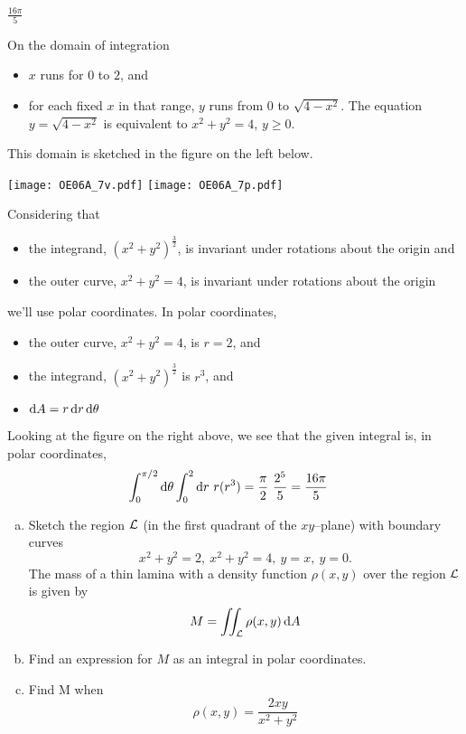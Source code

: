 \begin{answer}
$\frac{16\pi}{5}$
\end{answer}

\begin{solution}
On the domain of integration
\begin{itemize}
\item
$x$ runs for $0$ to $2$, and

\item
for each fixed $x$ in that range, $y$ runs from $0$ to $\sqrt{4-x^2}$.
The equation $y=\sqrt{4-x^2}$ is equivalent to $x^2+y^2=4$, $y\ge 0$.
\end{itemize}
This domain is sketched in the figure on the left below.
\begin{center}
     \texttt{[image: OE06A\_7v.pdf]}\qquad
     \texttt{[image: OE06A\_7p.pdf]}
\end{center}
Considering that
\begin{itemize}
\item
the integrand, ${(x^2+y^2)}^{\frac{3}{2}}$, is invariant under rotations 
about the origin and
\item
the outer curve, $x^2+y^2=4$, is invariant under rotations about the origin \end{itemize}
we'll use polar coordinates. 
In polar coordinates, 
\begin{itemize}
\item
the outer curve, $x^2+y^2=4$, is $r=2$, and
\item 
the integrand, ${(x^2+y^2)}^{\frac{3}{2}}$ is $r^3$, and
\item
$\mathrm{d}A=r\,\mathrm{d}r\,\mathrm{d}\theta$
\end{itemize}
Looking at the figure on the right above, we see that the given integral
is, in polar coordinates,
\begin{align*}
\int_0^{\pi/2}\mathrm{d}\theta\int_0^2\mathrm{d}r\ r (r^3)
&=\frac{\pi}{2}\ \frac{2^5}{5}
=\frac{16\pi}{5}
\end{align*}
\end{solution}


\begin{question}[M200 2006D] %
\begin{enumerate}[(a)]
\item
Sketch the region $\mathcal{L}$ (in the first quadrant of the $xy$--plane) 
with boundary curves
\begin{equation*}
x^2 + y^2 = 2,\ 
x^2 + y^2 = 4,\ 
y = x,\ 
y = 0.
\end{equation*}
The mass of a thin lamina with a density function $\rho(x,y)$ over 
the region $\mathcal{L}$ is given by
\begin{equation*}
M =\iint_{\mathcal{L}} \rho(x,y)\,\mathrm{d}A
\end{equation*}

\item
Find an expression for $M$ as an integral in polar coordinates.

\item
Find M when
\begin{equation*}
\rho(x,y) = \frac{2xy}{x^2+y^2}
\end{equation*}
\end{enumerate}
\end{question}

